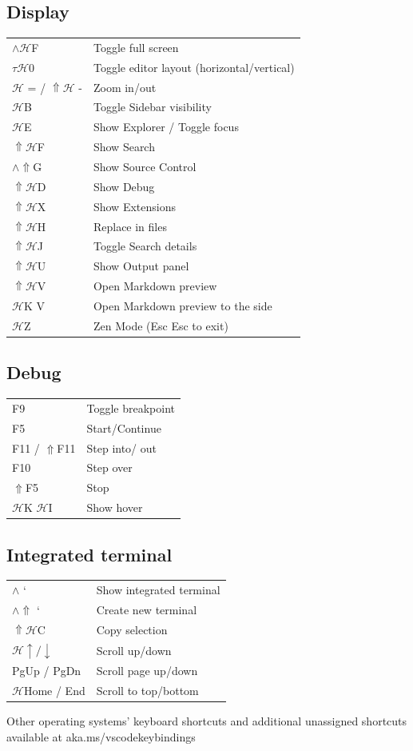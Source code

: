 \documentclass[UTF8]{article}
\begin{document}
\subsection*{Display}
\begin{tabular}{ll}
$\wedge\mathscr{H}$F & Toggle full screen \\
$\tau\mathscr{H}$0 & Toggle editor layout (horizontal/vertical) \\
$\mathscr{H}$ = / $\Uparrow\mathscr{H}$ - & Zoom in/out \\
$\mathscr{H}$B & Toggle Sidebar visibility \\
$\mathscr{H}$E & Show Explorer / Toggle focus \\
$\Uparrow\mathscr{H}$F & Show Search \\
$\wedge\Uparrow$G & Show Source Control \\
$\Uparrow\mathscr{H}$D & Show Debug \\
$\Uparrow\mathscr{H}$X & Show Extensions \\
$\Uparrow\mathscr{H}$H & Replace in files \\
$\Uparrow\mathscr{H}$J & Toggle Search details \\
$\Uparrow\mathscr{H}$U & Show Output panel \\
$\Uparrow\mathscr{H}$V & Open Markdown preview \\
$\mathscr{H}$K V & Open Markdown preview to the side \\
$\mathscr{H}$Z & Zen Mode (Esc Esc to exit) \\
\end{tabular}

\subsection*{Debug}
\begin{tabular}{ll}
F9 & Toggle breakpoint \\
F5 & Start/Continue \\
F11 / $\Uparrow$F11 & Step into/ out \\
F10 & Step over \\
$\Uparrow$F5 & Stop \\
$\mathscr{H}$K $\mathscr{H}$I & Show hover \\
\end{tabular}

\subsection*{Integrated terminal}
\begin{tabular}{ll}
$\wedge$ ` & Show integrated terminal \\
$\wedge\Uparrow$ ` & Create new terminal \\
$\Uparrow\mathscr{H}$C & Copy selection \\
$\mathscr{H}\uparrow / \downarrow$ & Scroll up/down \\
PgUp / PgDn & Scroll page up/down \\
$\mathscr{H}$Home / End & Scroll to top/bottom \\
\end{tabular}

Other operating systems' keyboard shortcuts and additional unassigned shortcuts available at aka.ms/vscodekeybindings
\end{document}
